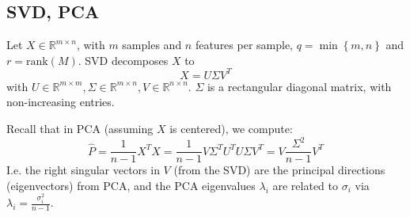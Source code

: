\documentclass{article}
\begin{document}
\subsection{SVD, PCA}
\begin{theorem}[SVD] Let $X \in \mathbb{R}^{m \times  n}$, with $m$ samples and $n$ features per sample,  $q = \min \left\{ m,n \right\}$ and $r = \mathrm{rank}(M)$. SVD decomposes $X$ to
\[
  X = U \Sigma V^{T}
\]
with $U \in \mathbb{R}^{m \times m}, \Sigma \in \mathbb{R}^{m \times n}, V \in \mathbb{R}^{n \times n}$.  $\Sigma$ is a rectangular diagonal matrix, with non-increasing entries.  

\end{theorem}


\begin{theorem} Recall that in PCA (assuming $X$ is centered), we compute:
\[
\hat{P} = \frac{1}{n-1} X^{T} X = \frac{1}{n-1} V \Sigma^{T} U ^{T} U \Sigma V^{T} = V \frac{\Sigma ^2}{n-1} V^{T}
\]
  I.e. the right singular vectors in $V$ (from the SVD) are the principal directions (eigenvectors) from PCA, and the PCA eigenvalues $\lambda_i$ are related to $\sigma_i$ via $\lambda_i = \frac{\sigma_i ^2}{n-1}$. 


\end{theorem}
\end{document}
